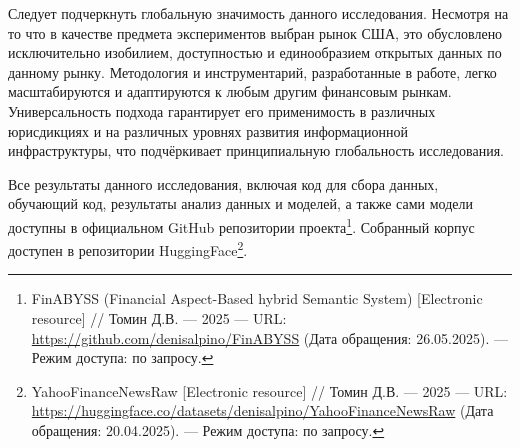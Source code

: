 Следует подчеркнуть глобальную значимость данного исследования. Несмотря на то что в качестве
предмета экспериментов выбран рынок США, это обусловлено исключительно изобилием, доступностью
и единообразием открытых данных по данному рынку. Методология и инструментарий, разработанные
в работе, легко масштабируются и адаптируются к любым другим финансовым рынкам. Универсальность
подхода гарантирует его применимость в различных юрисдикциях и на различных уровнях развития
информационной инфраструктуры, что подчёркивает принципиальную глобальность исследования.

Все результаты данного исследования, включая код для сбора данных, обучающий код, результаты анализ данных и моделей, а также сами модели доступны
в официальном GitHub репозитории проекта\footnote{FinABYSS (Financial Aspect-Based hybrid Semantic System) [Electronic resource] //
Томин Д.В. --- 2025 --- URL: \url{https://github.com/denisalpino/FinABYSS} (Дата обращения: 26.05.2025). --- Режим доступа: по запросу.}.
Собранный корпус доступен в репозитории HuggingFace\footnote{YahooFinanceNewsRaw [Electronic resource] //
Томин Д.В. --- 2025 --- URL: \url{https://huggingface.co/datasets/denisalpino/YahooFinanceNewsRaw} (Дата обращения: 20.04.2025). --- Режим доступа: по запросу.}.